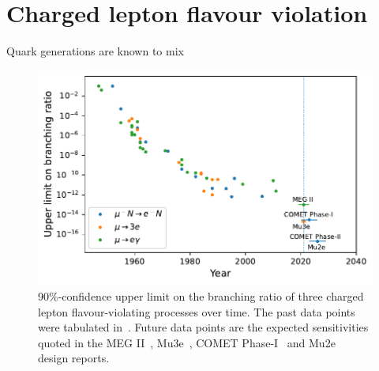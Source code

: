 \section{Charged lepton flavour violation}
Quark generations are known to mix

\begin{figure}
    \centering
    \includegraphics{chapter1/clfv_upper_limit.pdf}
    \caption{90\%-confidence upper limit on the branching ratio of three charged lepton flavour-violating processes over time. The past data points were tabulated in~\cite{BERNSTEIN201327}. Future data points are the expected sensitivities quoted in the MEG II~\cite{Baldini2018}, Mu3e~\cite{ARNDT2021165679}, COMET Phase-I~\cite{the_comet_collaboration_comet_2020} and Mu2e~\cite{bartoszek2015mu2e} design reports.}
    \label{fig:clfv_upper_limit}
\end{figure}




%
%
%
%
